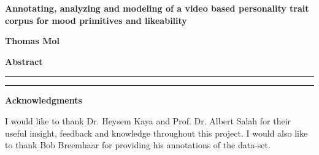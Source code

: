 \thispagestyle{plain}
\begin{center}
    \Large
    \textsf{
        \textbf{
            Annotating, analyzing and modeling of a video based personality trait corpus for mood primitives and likeability
        }
    }
    
    \large
    \vspace{0.4cm}
    \textbf{Thomas Mol}
   
    \vspace{0.9cm}
    \Large
    \textsf{\textbf{Abstract}}
\end{center}

\hrule
\vspace{6pt}

\vspace{6pt}
\hrule

\vfill

\begin{center}
    \Large
    \textsf{
        \textbf{Acknowledgments}
    }
\end{center}
I would like to thank Dr. Heysem Kaya and Prof. Dr. Albert Salah for their useful insight, feedback and knowledge throughout this project. I would also like to thank Bob Breemhaar for providing his annotations of the data-set.